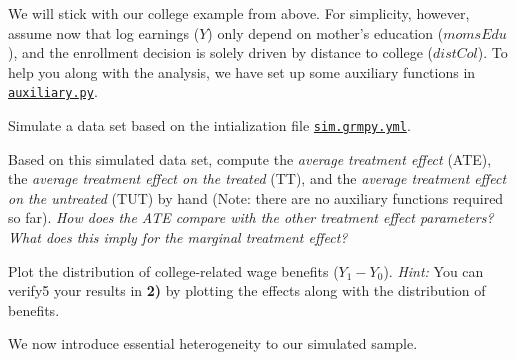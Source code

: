    We will stick with our college example from above. For simplicity, however, assume now that log earnings ($Y$) only depend on mother's education ($momsEdu$), and the enrollment decision is solely driven by distance to college ($distCol$). To help you along with the analysis, we have set up some auxiliary functions in  \href{https://github.com/HumanCapitalAnalysis/microeconometrics/blob/prset_grmpy/problem-sets/04-generalized-roy-model/sources/auxiliary.py}{\texttt{auxiliary.py}}.


\begin{boenumerate}
  \item Simulate a data set based on the intialization file \href{https://github.com/HumanCapitalAnalysis/microeconometrics/blob/prset_grmpy/problem-sets/04-generalized-roy-model/sources/sim.grmpy.yml}{\texttt{sim.grmpy.yml}}. 
  
  \item Based on this simulated data set, compute the \emph{average treatment effect} (ATE), the \emph{average treatment effect on the treated} (TT), and the \emph{average treatment effect on the untreated} (TUT) by hand (Note: there are no auxiliary functions required so far). \emph{How does the ATE compare with the other treatment effect parameters?} \emph{What does this imply for the marginal treatment effect?}
  
  \item Plot the distribution of college-related wage benefits ($Y_1 - Y_0$). \textit{Hint:} You can verify5 your results in \textbf{2)} by plotting the effects along with the distribution of benefits.
  
\end{boenumerate}

  \noindent We now introduce essential heterogeneity to our simulated sample.

